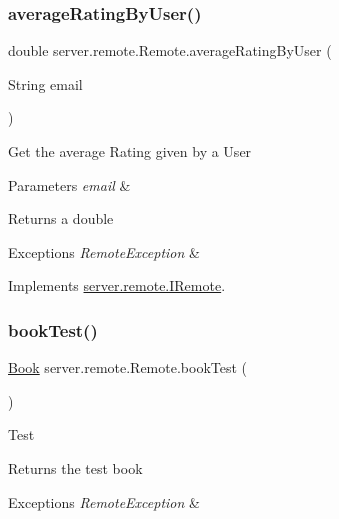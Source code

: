 \subsubsection{\texorpdfstring{average\+Rating\+By\+User()}{averageRatingByUser()}}
{\footnotesize\ttfamily double server.\+remote.\+Remote.\+average\+Rating\+By\+User (\begin{DoxyParamCaption}\item[{String}]{email }\end{DoxyParamCaption})}

Get the average Rating given by a User 
\begin{DoxyParams}{Parameters}
{\em email} & \\
\hline
\end{DoxyParams}
\begin{DoxyReturn}{Returns}
a double 
\end{DoxyReturn}

\begin{DoxyExceptions}{Exceptions}
{\em Remote\+Exception} & \\
\hline
\end{DoxyExceptions}


Implements \hyperlink{interfaceserver_1_1remote_1_1_i_remote_a11c915f0c22728be1898d46a78ac92cf}{server.\+remote.\+I\+Remote}.

\mbox{\label{classserver_1_1remote_1_1_remote_a38bce20fa59064fe8d970164d6155435}} 
\subsubsection{\texorpdfstring{book\+Test()}{bookTest()}}
{\footnotesize\ttfamily \hyperlink{classserver_1_1data_1_1_book}{Book} server.\+remote.\+Remote.\+book\+Test (\begin{DoxyParamCaption}{ }\end{DoxyParamCaption})}

Test \begin{DoxyReturn}{Returns}
the test book 
\end{DoxyReturn}

\begin{DoxyExceptions}{Exceptions}
{\em Remote\+Exception} & \\
\hline
\end{DoxyExceptions}



